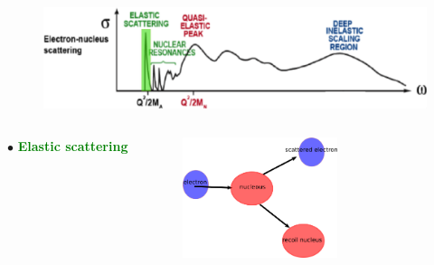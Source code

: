 \documentclass[12pt]{beamer}
\begin{document}

\begin{frame}

\begin{figure}[]
	\centering
	\includegraphics[width=12cm]{../images/Thesis/E_nucleus_spect_Elas.png}
\end{figure}
\begin{columns}[c] %
	$\bullet$ \textbf{\textcolor{green}{Elastic scattering}}\\
	\vspace{-30pt}
	\begin{figure}[]
		\includegraphics[height=3.5cm]{../images/elast_draw.png}
	\end{figure}
	
	
	
	
	
\end{columns}
\end{frame}

\end{document}
